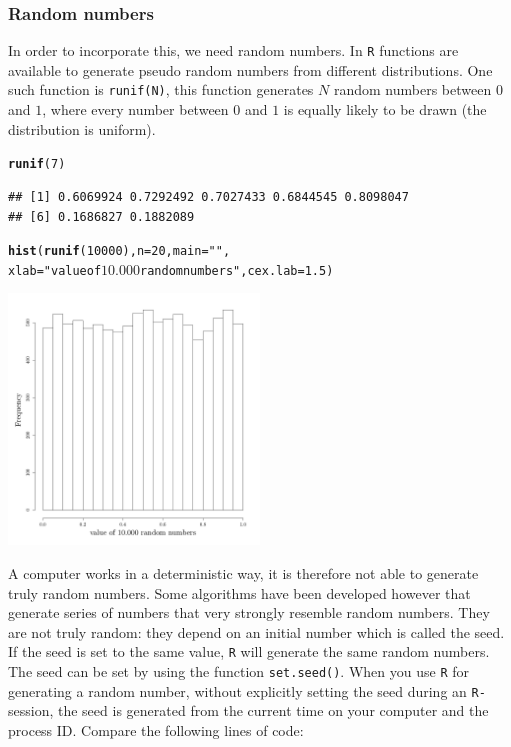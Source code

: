 \documentclass{article}\usepackage[]{graphicx}\usepackage[]{color}
\makeatletter
\newcommand{\hlnum}[1]{\textcolor[rgb]{0.686,0.059,0.569}{#1}}%
\newcommand{\hlstr}[1]{\textcolor[rgb]{0.192,0.494,0.8}{#1}}%
\newcommand{\hlstd}[1]{\textcolor[rgb]{0.345,0.345,0.345}{#1}}%
\newcommand{\hlkwc}[1]{\textcolor[rgb]{0.333,0.667,0.333}{#1}}%
\newcommand{\hlkwd}[1]{\textcolor[rgb]{0.737,0.353,0.396}{\textbf{#1}}}%
\newenvironment{kframe}{%
 \def\at@end@of@kframe{}%
 \ifinner\ifhmode%
  \def\at@end@of@kframe{\end{minipage}}%
  \begin{minipage}{\columnwidth}%
 \fi\fi%
 \def\FrameCommand##1{\hskip\@totalleftmargin \hskip-\fboxsep
 \colorbox{shadecolor}{##1}\hskip-\fboxsep
     \hskip-\linewidth \hskip-\@totalleftmargin \hskip\columnwidth}%
 \MakeFramed {\advance\hsize-\width
   \@totalleftmargin\z@ \linewidth\hsize
   \@setminipage}}%
 {\par\unskip\endMakeFramed%
 \at@end@of@kframe}
\newenvironment{knitrout}{}{} %
\makeatother
\begin{document}
\subsubsection{Random numbers}
In order to incorporate this, we need random numbers. In \texttt{R} functions are available to generate pseudo random numbers from different distributions. One such function is \texttt{runif(N)}, this function generates $N$ random numbers between $0$ and $1$, where every number between $0$ and $1$ is equally likely to be drawn (the distribution is uniform).
\begin{knitrout}
\color{fgcolor}\begin{kframe}
\begin{alltt}
\hlkwd{runif}\hlstd{(}\hlnum{7}\hlstd{)}
\end{alltt}
\begin{verbatim}
## [1] 0.6069924 0.7292492 0.7027433 0.6844545 0.8098047
## [6] 0.1686827 0.1882089
\end{verbatim}
\begin{alltt}
\hlkwd{hist}\hlstd{(}\hlkwd{runif}\hlstd{(}\hlnum{10000}\hlstd{),}\hlkwc{n}\hlstd{=}\hlnum{20}\hlstd{,}\hlkwc{main}\hlstd{=}\hlstr{""}\hlstd{,}
     \hlkwc{xlab}\hlstd{=}\hlstr{"value of $10.000$ random numbers"}\hlstd{,} \hlkwc{cex.lab}\hlstd{=}\hlnum{1.5}\hlstd{)}
\end{alltt}
\end{kframe}

{\centering \includegraphics[width=0.5\textwidth]{figure/k19-1} 

}



\end{knitrout}
A computer works in a deterministic way, it is therefore not able to generate truly random numbers. Some algorithms have been developed however that generate series of numbers that very strongly resemble random numbers. They are not truly random: they depend on an initial number which is called the seed. If the seed is set to the same value, \texttt{R} will generate the same random numbers. The seed can be set by using the function \texttt{set.seed()}. When you use \texttt{R} for generating a random number, without explicitly setting the seed during an \texttt{R-}session, the seed is generated from the current time on your computer and the process ID. Compare the following lines of code:
\end{document}
